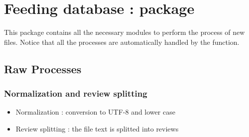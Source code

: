 \documentclass[letterpaper,10pt,english]{sphinxmanual}
\begin{document}
\chapter{Feeding database :  package}
\label{\detokenize{process:feeding-database-process-package}}\label{\detokenize{process::doc}}
This package contains all the necessary modules to perform the process of new files. Notice that all the processes are automatically handled by the  function.


\section{Raw Processes}
\label{\detokenize{process:raw-processes}}

\subsection{Normalization and review splitting}
\label{\detokenize{process:normalization-and-review-splitting}}\begin{itemize}
\item {} 
Normalization : conversion to UTF-8 and lower case

\item {} 
Review splitting : the file text is splitted into reviews

\end{itemize}
\label{\detokenize{process:module-loacore.process.review_process}}
\end{document}
